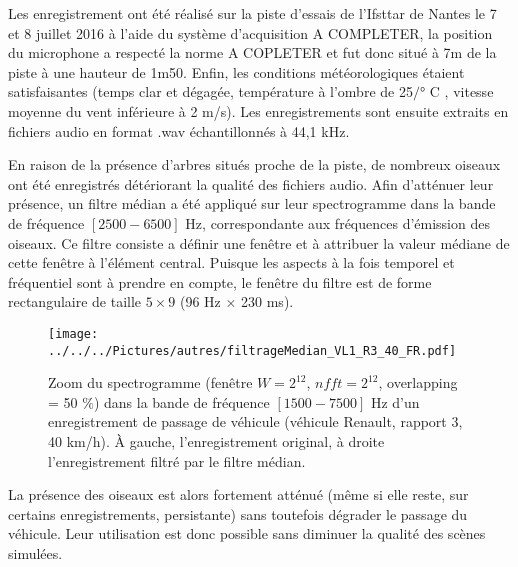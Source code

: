 

Les enregistrement ont été réalisé sur la piste d'essais de l'Ifsttar de Nantes le 7 et 8 juillet 2016 à l'aide du système d'acquisition A COMPLETER, la position du microphone a respecté la norme A COPLETER et fut donc situé à 7m de la piste à une hauteur de 1m50. Enfin, les conditions météorologiques étaient satisfaisantes (temps clar et dégagée, température à l'ombre de 25$/°$ C , vitesse moyenne du vent inférieure à 2 m/s). Les enregistrements sont ensuite extraits en fichiers audio en format .wav échantillonnés à 44,1 kHz.
 
En raison de la présence d'arbres situés proche de la piste, de nombreux oiseaux ont été enregistrés détériorant la qualité des fichiers audio. Afin d'atténuer leur présence, un filtre médian a été appliqué sur leur spectrogramme \cite{fitzgerald_drum_2010} dans la bande de fréquence $\left[2500 - 6500\right]$ Hz, correspondante aux fréquences d'émission des oiseaux. Ce filtre consiste a définir une fenêtre et à attribuer la valeur médiane de cette fenêtre à l'élément central. Puisque les aspects à la fois temporel et fréquentiel sont à prendre en compte, le fenêtre du filtre est de forme rectangulaire de taille $5 \times 9$ (96 Hz $\times$ 230 ms).\\

\begin{figure}[hbtp]
\centering
\texttt{[image: ../../../Pictures/autres/filtrageMedian\_VL1\_R3\_40\_FR.pdf]}
\caption{Zoom du spectrogramme (fenêtre $W = 2^{12}$, $nfft = 2^{12}$, overlapping = 50 $\%$) dans la bande de fréquence $\left[1500-7500 \right]$ Hz d'un enregistrement de passage de véhicule (véhicule Renault, rapport 3, 40 km/h). \`A gauche, l'enregistrement original, à droite l'enregistrement filtré par le filtre médian.}
\end{figure}


La présence des oiseaux est alors fortement atténué (même si elle reste, sur certains enregistrements, persistante) sans toutefois dégrader le passage du véhicule. Leur utilisation est donc possible sans diminuer la qualité des scènes simulées.\\

